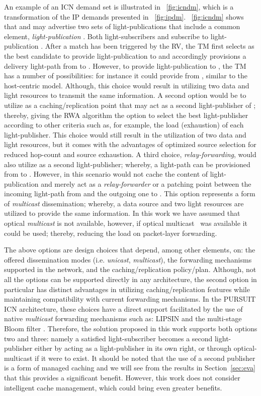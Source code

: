 \documentclass[journal]{IEEEtran}
\begin{document}
An example of an ICN demand set is illustrated in
\figurename~\ref{fig:icndm}, which is a transformation of the IP
demands presented in
\figurename~\ref{fig:ipdm}. \figurename~\ref{fig:icndm} shows that
 and  may advertise two sets of light-publications that
include a common element, \emph{light-publication }. Both
light-subscribers  and  subscribe to light-publication
. After a match has been triggered by the RV, the TM first selects
 as the best candidate to provide light-publication  to 
and accordingly provisions a delivery light-path from  to
. However, to provide light-publication  to , the TM has
a number of possibilities: for instance it could provide  from
, similar to the host-centric model. Although, this choice would
result in utilizing two data and light resources to transmit the same
information. A second option would be to utilize  as a
caching/replication point that may act as a second light-publisher of
; thereby, giving the RWA algorithm the option to select the best
light-publisher according to other criteria such as, for example, the
load (exhaustion) of each light-publisher. This choice would still
result in the utilization of two data and light resources, but it
comes with the advantages of optimized source selection for reduced
hop-count and source exhaustion. A third choice,
\emph{relay-forwarding}, would also utilize  as a second
light-publisher; whereby, a light-path can be provisioned from 
to . However, in this scenario  would not cache the content
of light-publication  and merely act as a \emph{relay-forwarder} or a patching
point between the incoming light-path from  and the outgoing one
to . This option represents a form of \emph{multicast}
dissemination; whereby, a data source and two light
resources are utilized to provide the same information. In this work
we have assumed that optical \emph{multicast} is not available,
however, if optical multicast~\cite{cha:omc} was available it could be
used; thereby, reducing the load on packet-layer forwarding. 
 
 The above options are design choices that depend, among other
 elements, on: the offered dissemination modes (i.e. \emph{unicast},
 \emph{multicast}), the forwarding mechanisms supported in the network, and
 the caching/replication policy/plan. Although, not all the options
 can be supported directly in any architecture, the second option in
 particular has distinct advantages in utilizing caching/replication
 features while maintaining compatibility with current forwarding
 mechanisms. In the PURSUIT ICN architecture, these choices have a
 direct support facilitated by the use of native \emph{multicast} forwarding
 mechanisms such as: LIPSIN \cite{pet:ICnet} and the multi-stage Bloom
 filter \cite{tap:bf}. Therefore, the solution proposed in this
 work supports both options two and three: namely a satisfied
 light-subscriber becomes a second light-publisher either by acting as a light-publisher in its own right, or through optical-multicast if it were to exist. 
It should be noted that the use of a second publisher is a form of
managed caching and we will see from the results in
Section~\ref{sec:eva} that this provides a significant
benefit. However, this work does not consider intelligent cache
management, which could bring even greater benefits.
 
\end{document}
